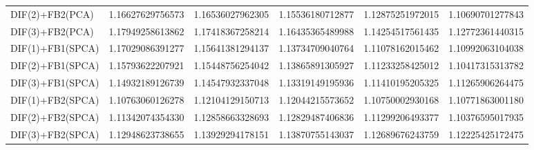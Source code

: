 \begin{table}[h]
\begin{adjustbox}{totalheight=\baselineskip}
\begin{tabular}{lSSSSS}
DIF(2)+FB2(PCA) & 1.16627629756573 & 1.16536027962305 & 1.15536180712877 & 1.12875251972015 & 1.10690701277843 \\ 
DIF(3)+FB2(PCA) & 1.17949258613862 & 1.17418367258214 & 1.16435365489988 & 1.14254517561435 & 1.12772361440315 \\ 
DIF(1)+FB1(SPCA) & 1.17029086391277 & 1.15641381294137 & 1.13734709040764 & 1.11078162015462 & 1.10992063104038 \\ 
DIF(2)+FB1(SPCA) & 1.15793622207921 & 1.15448756254042 & 1.13865891305927 & 1.11233258425012 & 1.10417315313782 \\ 
DIF(3)+FB1(SPCA) & 1.14932189126739 & 1.14547932337048 & 1.13319149195936 & 1.11410195205325 & 1.11265906264475 \\ 
DIF(1)+FB2(SPCA) & 1.10763060126278 & 1.12104129150713 & 1.12044215573652 & 1.10750002930168 & 1.10771863001180 \\ 
DIF(2)+FB2(SPCA) & 1.11342074354330 & 1.12858663328693 & 1.12829487406836 & 1.11299206493377 & 1.10376595017935 \\ 
DIF(3)+FB2(SPCA) & 1.12948623738655 & 1.13929294178151 & 1.13870755143037 & 1.12689676243759 & 1.12225425172475 \\ \bottomrule 
\end{tabular}
\end{adjustbox}
\end{table}



